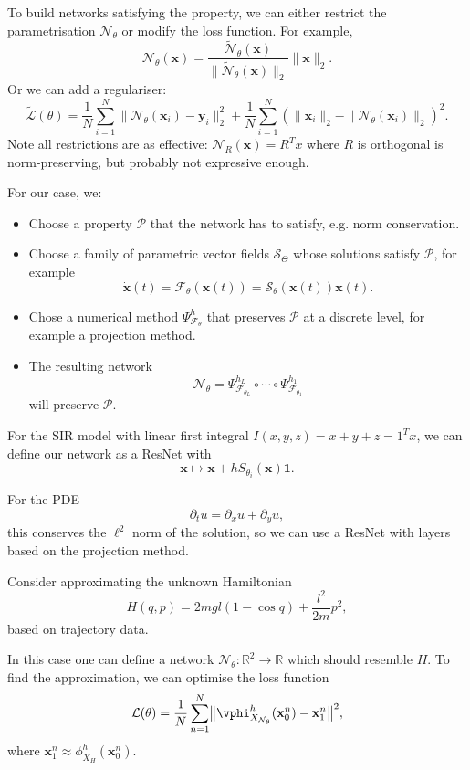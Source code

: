 \documentclass[12pt]{article}
\begin{document}
To build networks satisfying the property, we can either restrict the parametrisation $\mathcal{N}_{\theta}$ or modify the loss function. For example,
\[
	\mathcal{N}_{\theta}(\mathbf{x}) = \frac{\tilde{\mathcal{N}}_{\theta}(\mathbf{x})}{\| \tilde{\mathcal{N}}_\theta(\mathbf{x})\|_2} \|\mathbf{x}\|_2.
\]
Or we can add a regulariser:
\[
	\tilde{\mathcal{L}}(\theta) = \frac 1N \sum_{i = 1}^{N} \|\mathcal{N}_\theta(\mathbf{x}_i) - \mathbf{y}_i\|_2^2 + \frac 1N \sum_{i = 1}^{N} ( \|\mathbf{x}_i\|_2 - \|\mathcal{N}_\theta(\mathbf{x}_i)\|_2)^2.
\]
Note all restrictions are as effective: $\mathcal{N}_R(\mathbf{x}) = R^{T}x$ where $R$ is orthogonal is norm-preserving, but probably not expressive enough.

For our case, we:
\begin{itemize}
	\item Choose a property $\mathcal{P}$ that the network has to satisfy, e.g. norm conservation.
	\item Choose a family of parametric vector fields $\mathcal{S}_{\Theta}$ whose solutions satisfy $\mathcal{P}$, for example
		\[
		\mathbf{\dot x}(t) = \mathcal{F}_{\theta}(\mathbf{x}(t)) = \mathcal{S}_{\theta}(\mathbf{x}(t)) \mathbf{x}(t).
		\]
		
	\item Chose a numerical method $\Psi_{\mathcal{F}_\theta}^{h}$ that preserves $\mathcal{P}$ at a discrete level, for example a projection method.
	\item The resulting network
		\[
		\mathcal{N}_{\theta} = \Psi_{\mathcal{F}_{\theta_L}}^{h_L} \circ \cdots \circ \Psi_{\mathcal{F}_{\theta_1}}^{h_1}
		\]
		will preserve $\mathcal{P}$.
\end{itemize}

\begin{exbox}
	For the SIR model with linear first integral $I(x, y, z) = x + y + z = 1^{T} x$, we can define our network as a ResNet with
	\[
	\mathbf{x} \mapsto \mathbf{x} + h S_{\theta_i}(\mathbf{x}) \mathbf{1}.
	\]

	For the PDE
	\[
	\partial_t u = \partial_x u + \partial_y u,
	\]
	this conserves the $\ell^2$ norm of the solution, so we can use a ResNet with layers based on the projection method.
\end{exbox}

\begin{exbox}
	Consider approximating the unknown Hamiltonian
	\[
	H(q, p) = 2 mg l (1 - \cos q) + \frac{l^2}{2m}p^2,
	\]
	based on trajectory data.

	In this case one can define a network $\mathcal{N}_\theta : \mathbb{R}^2 \to \mathbb{R}$ which should resemble $H$. To find the approximation, we can optimise the loss function
	\[
	\mathcal{L}(\theta) = \frac 1N \sum_{n = 1}^{N} \bigl\|\vphi_{X_{\mathcal{N}_\theta}}^{h}(\mathbf{x}_0^{n}) - \mathbf{x}_1^{n}\bigr\|^2,
	\]
	where $\mathbf{x}_1^{n} \approx \phi_{X_H}^{h}(\mathbf{x}_0^{n})$.
\end{exbox}
\end{document}
